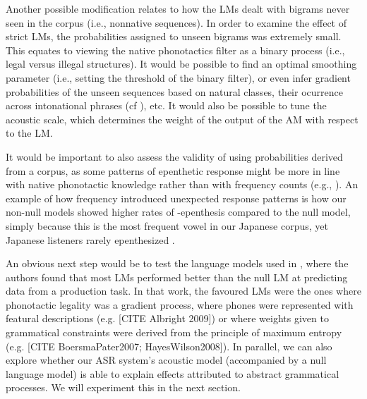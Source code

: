 {Another possible modification relates to how the LMs dealt with bigrams never seen in the corpus (i.e., nonnative sequences). In order to examine the effect of strict LMs, the probabilities assigned to unseen bigrams was extremely small. This equates to viewing the native phonotactics filter as a binary process (i.e., legal versus illegal structures). It would be possible to find an optimal smoothing parameter (i.e., setting the threshold of the binary filter), or even infer gradient probabilities of the unseen sequences based on natural classes, their ocurrence across intonational phrases (cf \cite{durvasula2016}), etc. It would also be possible to tune the acoustic scale, which determines the weight of the output of the AM with respect to the LM.

It would be important to also assess the validity of using probabilities derived from a corpus, as some patterns of epenthetic response might be more in line with native phonotactic knowledge rather than with frequency counts (e.g., \cite{kabak2007}). An example of how frequency introduced unexpected response patterns is how our non-null models showed higher rates of -epenthesis compared to the null model, simply because this is the most frequent vowel in our Japanese corpus, yet Japanese listeners rarely epenthesized \textipa{[a]}.  

An obvious next step would be to test the language models used in \cite{wilson2013}, where the authors found that most LMs performed better than the null LM at predicting data from a production task. In that work, the favoured LMs were the ones where phonotactic legality was a gradient process, where phones were represented with featural descriptions (e.g. {\color{red}[CITE Albright 2009]}) or where weights given to grammatical constraints were derived from the principle of maximum entropy (e.g. {\color{red}[CITE BoersmaPater2007; HayesWilson2008]}). In parallel, we can also explore whether our ASR system's acoustic model (accompanied by a null language model) is able to explain effects attributed to abstract grammatical processes. We will experiment this in the next section. 

}
